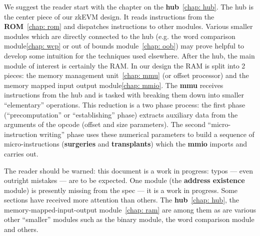 We suggest the reader start with the chapter on the \textbf{hub}~\ref{chap: hub}. The hub is the center piece of our zkEVM design. It reads instructions from the \textbf{ROM}~\ref{chap: rom} and dispatches instructions to other modules. Various smaller modules which are directly connected to the hub (e.g. the word comparison module\ref{chap: wcp} or out of bounds module~\ref{chap: oob}) may prove helpful to develop some intuition for the techniques used elsewhere. After the hub, the main module of interest is certainly the RAM. In our design the RAM is split into 2 pieces: the memory management unit~\ref{chap: mmu} (or offset processor) and the memory mapped input output module\ref{chap: mmio}. The \textbf{mmu} receives instructions from the hub and is tasked with breaking them down into smaller ``elementary'' operations. This reduction is a two phase process: the first phase (``precomputation'' or ``establishing'' phase) extracts auxiliary data from the arguments of the opcode (offset and size parameters). The second ``micro-instruction writing'' phase uses these numerical parameters to build a sequence of micro-instructions (\textbf{surgeries} and \textbf{transplants}) which the \textbf{mmio} imports and carries out.

The reader should be warned: this document is a work in progress: typos --- even outright mistakes --- are to be expected. One module (the \textbf{address existence} module) is presently missing from the spec --- it is a work in progress. Some sections have received more attention than others. The \textbf{hub}~\ref{chap: hub}, the memory-mapped-input-output module~\ref{chap: ram} are among them as are various other ``smaller'' modules such as the binary module, the word comparison module and others.
